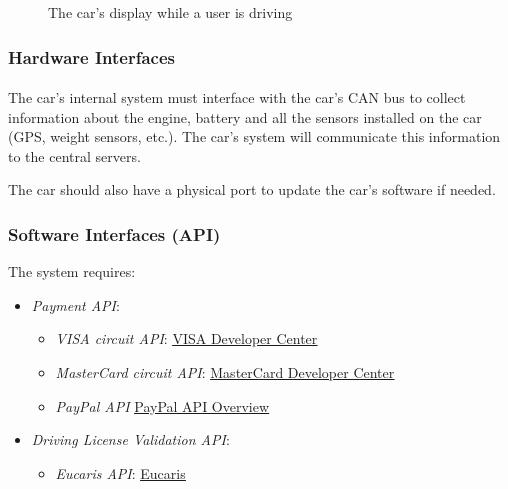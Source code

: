 \documentclass[english]{article}
\begin{document}
\begin{figure}[H]
	\centering
	\caption{The car's display while a user is driving}
\end{figure}


\subsubsection{Hardware Interfaces}

\paragraph{}
The car's internal system must interface with the car's CAN bus to collect information about the engine, battery and all the sensors installed on the car (GPS, weight sensors, etc.). The car's system will communicate this information to the central servers.

The car should also have a physical port to update the car's software if needed.

\subsubsection{Software Interfaces (API)}\label{apis}

The system requires:
\begin{itemize}
  \item{\textit{Payment API}:
      \begin{itemize}
        \item{\textit{VISA circuit API}:
          \href{https://developer.visa.com}{\underline{VISA Developer Center}}}
        \item{\textit{MasterCard circuit API}:
          \href{https://developer.mastercard.com/apis}{\underline{MasterCard Developer Center}}}
        \item{\textit{PayPal API}
          \href{https://developer.paypal.com/docs/api/overview/}{\underline{PayPal API Overview}}}
      \end{itemize}}
    \item{\textit{Driving License Validation API}:
      \begin{itemize}
        \item{\textit{Eucaris API}:
          \href{https://www.eucaris.net}{\underline{Eucaris}}}
      \end{itemize}}
\end{itemize}
\end{document}
